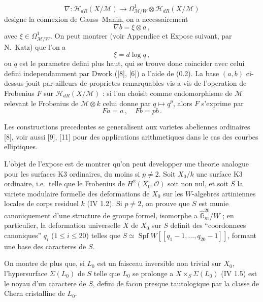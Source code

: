 \documentclass[12pt,a4paper]{article}
\theoremstyle{plain}
\theoremstyle{definition}
\theoremstyle{remark}
\DeclareMathOperator{\Spf}{Spf}
\begin{document}
\[
\nabla : \mathcal{H}_{dR}(X/\mathcal{M}) \longrightarrow \Omega^1_{\mathcal{M}/W} \otimes \mathcal{H}_{dR}(X/\mathcal{M})
\]
designe la connexion de Gauss--Manin, on a necessairement
\begin{equation}\label{eq:0.1}
\nabla b = \xi \otimes a\,,
\end{equation}
avec $\xi \in \Omega^1_{\mathcal{M}/W}$. On peut montrer (voir Appendice et Expose suivant, par N.\ Katz) que l'on a
\begin{equation}\label{eq:0.2}
\xi = d\log q\,,
\end{equation}
ou $q$ est le parametre defini plus haut, qui se trouve donc coincider avec celui defini independamment par Dwork ([8], [6]) a l'aide de (0.2). La base $(a,b)$ ci-dessus jouit par ailleurs de proprietes remarquables vis-a-vis de l'operation de Frobenius $F$ sur $\mathcal{H}_{dR}(X/\mathcal{M})$ : si l'on choisit comme endomorphisme de $\mathcal{M}$ relevant le Frobenius de $\mathcal{M} \otimes k$ celui donne par $q \mapsto q^p$, alors $F$ s'exprime par
\begin{equation}\label{eq:0.3}
Fa = a\,, \quad Fb = pb\,.
\end{equation}

Les constructions precedentes se generalisent aux varietes abeliennes ordinaires [8], voir aussi [9], [11] pour des applications arithmetiques dans le cas des courbes elliptiques.

L'objet de l'expose est de montrer qu'on peut developper une theorie analogue pour les surfaces K3 ordinaires, du moins si $p \neq 2$. Soit $X_0/k$ une surface K3 ordinaire, i.e.\ telle que le Frobenius de $H^2(X_0, \mathcal{O})$ soit non nul, et soit $S$ la variete modulaire formelle des deformations de $X_0$ sur les $W$-algebres artiniennes locales de corps residuel $k$ (IV 1.2). Si $p \neq 2$, on prouve que $S$ est munie canoniquement d'une structure de groupe formel, isomorphe a $\widehat{\mathbb{G}}_m^{20}/W$ ; en particulier, la deformation universelle $X$ de $X_0$ sur $S$ definit des ``coordonnees canoniques'' $q_i$ ($1 \leq i \leq 20$) telles que $S \simeq \Spf W[[q_1-1, \ldots, q_{20}-1]]$, formant une base des caracteres de $S$.

On montre de plus que, si $L_0$ est un faisceau inversible non trivial sur $X_0$, l'hypersurface $\Sigma(L_0)$ de $S$ telle que $L_0$ se prolonge a $X \times_S \Sigma(L_0)$ (IV 1.5) est le noyau d'un caractere de $S$, defini de facon presque tautologique par la classe de Chern cristalline de $L_0$.
\end{document}
